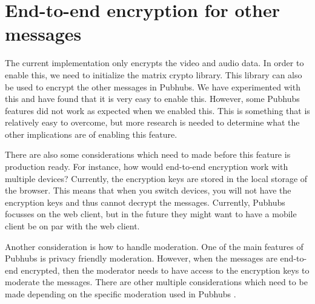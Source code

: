 \documentclass{report}
\begin{document}
\section{End-to-end encryption for other messages}
The current implementation only encrypts the video and audio data. In order to enable this, we need to initialize the
matrix crypto library. This library can also be used to encrypt the other messages in Pubhubs. We have experimented
with this and have found that it is very easy to enable this. However, some Pubhubs features did not work as expected
when we enabled this. This is something that is relatively easy to overcome, but more research is needed to determine
what the other implications are of enabling this feature.

There are also some considerations which need to made before this feature is production ready.
For instance, how would end-to-end encryption work with multiple devices? Currently, the encryption keys are stored in
the local storage of the browser. This means that when you switch devices, you will not have the encryption keys and
thus cannot decrypt the messages. Currently, Pubhubs focusses on the web client, but in the future they might want to
have a mobile client be on par with the web client.

Another consideration is how to handle moderation. One of the main features of Pubhubs is privacy friendly moderation.
However, when the messages are end-to-end encrypted, then the moderator needs to have access to the encryption keys to
moderate the messages. There are other multiple considerations which need to be made depending on the specific
moderation used in Pubhubs \cite{noauthor_group_nodate}.

\newpage


\end{document}
